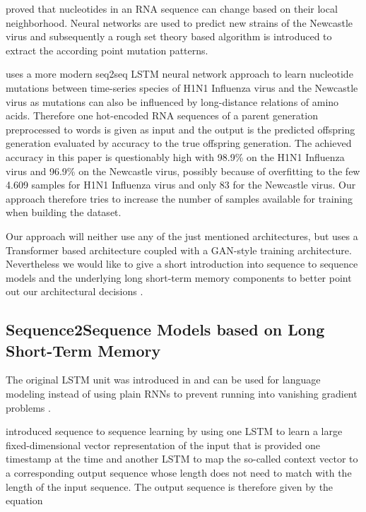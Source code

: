 \cite{Salama2016} proved that nucleotides in an RNA sequence can change based on their local neighborhood. Neural networks are used to predict new strains of the Newcastle virus and subsequently a rough set theory based algorithm is introduced to extract the according point mutation patterns. 

\cite{Mohamed2021} uses a more modern seq2seq LSTM neural network approach to learn nucleotide mutations between time-series species of H1N1 Influenza virus and the Newcastle virus as mutations can also be influenced by long-distance relations of amino acids. Therefore one hot-encoded RNA sequences of a parent generation preprocessed to words is given as input and the output is the predicted offspring generation evaluated by accuracy to the true offspring generation. The achieved accuracy in this paper is questionably high with 98.9\% on the H1N1 Influenza virus and 96.9\% on the Newcastle virus, possibly because of overfitting to the few 4.609 samples for H1N1 Influenza virus and only 83 for the Newcastle virus. Our approach therefore tries to increase the number of samples available for training when building the dataset. 

Our approach will neither use any of the just mentioned architectures, but uses a Transformer based architecture coupled with a GAN-style training architecture. Nevertheless we would like to give a short introduction into sequence to sequence models and the underlying long short-term memory components to better point out our architectural decisions . 

\subsection{Sequence2Sequence Models based on Long Short-Term Memory} \label{fundamentalsE}


The original \ac{LSTM} unit was introduced in \cite{Hochreiter1997} and can be used for language modeling instead of using plain \acp{RNN} to prevent running into vanishing gradient problems \cite{Sundermeyer2012}. 




\cite{bla} introduced sequence to sequence learning by using one LSTM to learn a large fixed-dimensional vector representation of the input that is provided one timestamp at the time and another \ac{LSTM} to map the so-called context vector to a corresponding output sequence whose length does not need to match with the length of the input sequence. The output sequence is therefore given by the equation

